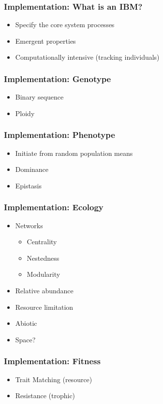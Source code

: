 \documentclass[serif,mathserif]{beamer}
\begin{document}
\begin{frame}
  \frametitle{Implementation: What is an IBM?}
  \begin{itemize}
  \item Specify the core system processes 
  \item Emergent properties 
  \item Computationally intensive (tracking individuals) 
  \end{itemize}
\end{frame}

\begin{frame}
  \frametitle{Implementation: Genotype}
  \begin{itemize}
    \item Binary sequence
    \item Ploidy
  \end{itemize}
\end{frame}

\begin{frame}
  \frametitle{Implementation: Phenotype}
  \begin{itemize}
    \item Initiate from random population means
    \item Dominance
    \item Epistasis
  \end{itemize}
\end{frame}

\begin{frame}
  \frametitle{Implementation: Ecology}
  \begin{itemize}
    \item Networks 
      \begin{itemize}
      \item Centrality
      \item Nestedness
      \item Modularity
      \end{itemize}
  \item Relative abundance
  \item Resource limitation
  \item Abiotic
  \item Space?
  \end{itemize}
\end{frame}

\begin{frame}
  \frametitle{Implementation: Fitness}
  \begin{itemize}
  \item Trait Matching (resource) 
  \item Resistance (trophic)
  \end{itemize}
\end{frame}
\end{document}
